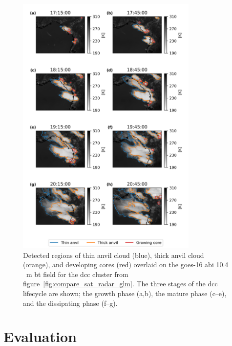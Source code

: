 \begin{figure}[tp]
    \centering\includegraphics[width=0.8\textwidth]{figures/chapter1_18.png}
    \caption[
    Detected regions of thin anvil cloud, thick anvil cloud , and developing cores through the growing, mature and dissipating phases of the \acrshort{dcc} lifecycle
    ]{
    Detected regions of thin anvil cloud (blue), thick anvil cloud (orange), and developing cores (red) overlaid on the \acrshort{goes}-16 \acrshort{abi} 10.4\,\unit{\mu m} \acrshort{bt} field for the \acrshort{dcc} cluster from figure~\ref{fig:compare_sat_radar_glm}. The three stages of the \acrshort{dcc} lifecycle are shown; the growth phase (a,b), the mature phase (c--e), and the dissipating phase (f--g).
    }
    \label{fig:detected_anvils}
\end{figure}


\section{Evaluation}


